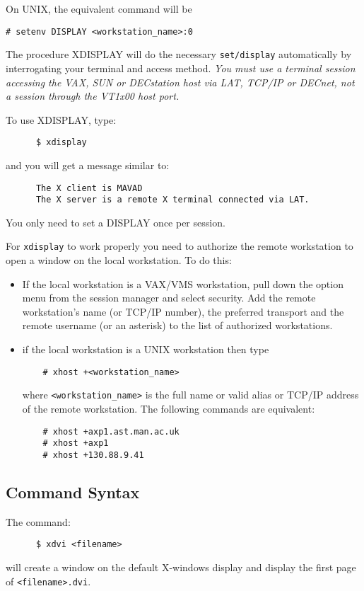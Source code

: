 On UNIX, the
equivalent command will be 
\begin{verbatim} 
# setenv DISPLAY <workstation_name>:0 
\end{verbatim}


The procedure XDISPLAY will do the necessary {\tt set/display} automatically
by interrogating your terminal and access method. {\em You must use a terminal
session accessing the VAX, SUN or DECstation host via LAT, TCP/IP or DECnet,
not a session through the  VT1x00 host port.}

To use XDISPLAY, type:
\begin{verbatim}
      $ xdisplay 
\end{verbatim}
and you will get a message similar to:
\begin{verbatim}
      The X client is MAVAD
      The X server is a remote X terminal connected via LAT.
\end{verbatim}
You only need to set a DISPLAY once per session.

For {\tt xdisplay} to work properly you need to authorize the remote
workstation to open a window on the local workstation. To do this:
\begin{itemize}
\item If the local workstation is a VAX/VMS workstation, pull down the option
menu from the session manager and select security. Add the remote workstation's
name (or TCP/IP number), the preferred transport and the remote username (or an
asterisk) to the list of authorized workstations.
\item if the local workstation is a UNIX workstation then type
\begin{verbatim}
	# xhost +<workstation_name>
\end{verbatim}
where \verb+<workstation_name>+ is the full name or valid alias or TCP/IP
address of the remote workstation. The following commands are equivalent:
\begin{verbatim}
	# xhost +axp1.ast.man.ac.uk
	# xhost +axp1
	# xhost +130.88.9.41
\end{verbatim}
\end{itemize}

\subsection{Command Syntax}
The command:
\begin{verbatim}
      $ xdvi <filename>
\end{verbatim}
will create a window on the default X-windows display and display the first 
page of {\tt <filename>.dvi}.

